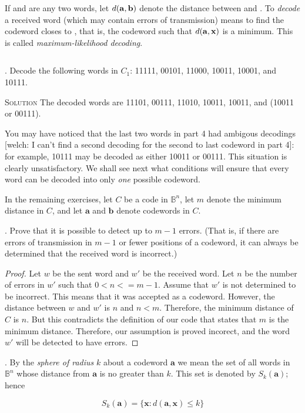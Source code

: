 \documentclass[twoside]{amsart}
\newcommand{\Solution}{\textsc{Solution}\xspace}
\begin{document}
\begin{enumerate}[A.]
      If  and  are any two words, let $d(\mathbf{a},\mathbf{b})$
      denote the distance between  and . To \emph{decode}
      a received word  (which may contain errors of transmission) means
      to find the codeword closes to , that is, the codeword 
      such that $d(\mathbf{a},\mathbf{x})$ is a minimum. This is called
      \emph{maximum-likelihood decoding}.
\begin{verbatim}
\end{verbatim}
      . Decode the following words in $C_1$: 11111, 00101,
      11000, 10011, 10001, and 10111.

      \noindent \Solution The decoded words are 11101, 00111, 11010, 10011,
      10011, and (10011 or 00111).

      You may have noticed that the last two words in part 4 had ambigous
      decodings [welch: I can't find a second decoding for the second to last
      codeword in part 4]: for example, 10111 may be decoded as either
      10011 or 00111. This situation is clearly unsatisfactory. We shall see
      next what conditions will ensure that every word can be decoded into
      only \emph{one} possible codeword.

      In the remaining exercises, let $C$ be a code in $\mathbb{B}^n$,
      let $m$ denote the minimum distance in $C$, and let 
      $\mathbf{a}$ and $\mathbf{b}$ denote codewords in $C$.

      . Prove that it is possible to detect up to $m-1$ errors.
      (That is, if there are errors of transmission in $m-1$ or 
      fewer positions of a codeword, it can always be determined
      that the received word is incorrect.)

      \begin{proof}
	 Let $w$ be the sent word and $w'$ be the received word. Let 
	 $n$ be the number of errors in $w'$ such that $0 < n <= m - 1$. 
	 Assume that $w'$ is not determined to be incorrect. This means
	 that it was accepted as a codeword. However, the distance
	 between $w$ and $w'$ is $n$ and $n < m$. Therefore, the 
	 minimum distance of $C$ is $n$. But this contradicts
	 the definition of our code that states that $m$ is the minimum
	 distance. Therefore, our assumption is proved incorect, and
	 the word $w'$ will be detected to have errors.
      \end{proof}

      . By the \emph{sphere of radius} $k$ about a codeword
      $\mathbf{a}$ we mean the set of all words in $\mathbb{B}^n$
      whose distance from $\mathbf{a}$ is no greater than $k$. This set
      is denoted by $S_k(\mathbf{a})$; hence 
      \begin{center}
      $$ S_k(\mathbf{a}) = \{\mathbf{x} : d(\mathbf{a},\mathbf{x}) \le k \}$$
      \end{center}


\end{enumerate}
\end{document}
